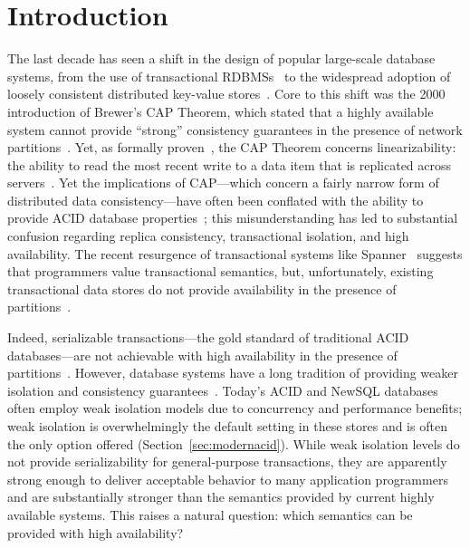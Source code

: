 
\section{Introduction}

The last decade has seen a shift in the design of popular large-scale
database systems, from the use of transactional
RDBMSs~\cite{bernstein-book, gray-isolation, gray-virtues} to the
widespread adoption of loosely consistent distributed key-value
stores~\cite{bigtable, pnuts, dynamo}. Core to this shift was the 2000
introduction of Brewer's CAP Theorem, which stated that a highly
available system cannot provide ``strong'' consistency guarantees in
the presence of network partitions~\cite{brewer-slides}. Yet, as
formally proven~\cite{gilbert-cap}, the CAP Theorem concerns
linearizability: the ability to read the most recent write to a data
item that is replicated across servers~\cite{herlihy-art}. Yet the
implications of CAP---which concern a fairly narrow form of
distributed data consistency---have often been conflated with the
ability to provide ACID database
properties~\cite{hat-hotos,brewer-slides, foundation-article}; this
misunderstanding has led to substantial confusion regarding replica
consistency, transactional isolation, and high availability. The
recent resurgence of transactional systems like Spanner~\cite{spanner}
suggests that programmers value transactional semantics, but,
unfortunately, existing transactional data stores do not provide
availability in the presence of partitions~\cite{foundation-article,
  hstore,spanner,eiger,  walter, calvin}.

Indeed, serializable transactions---the gold standard of traditional
ACID databases---are not achievable with high availability in the
presence of partitions~\cite{davidson-survey}. However, database
systems have a long tradition of providing weaker isolation and
consistency guarantees~\cite{adya, ansicritique, gray-virtues,
  gray-isolation, kemme-thesis}. Today's ACID and NewSQL databases
often employ weak isolation models due to concurrency and performance
benefits; weak isolation is overwhelmingly the default setting in
these stores and is often the only option offered
(Section~\ref{sec:modernacid}). While weak isolation levels do not
provide serializability for general-purpose transactions, they are
apparently strong enough to deliver acceptable behavior to many
application programmers and are substantially stronger than the
semantics provided by current highly available systems. This raises a
natural question: which semantics can be provided with high
availability?

